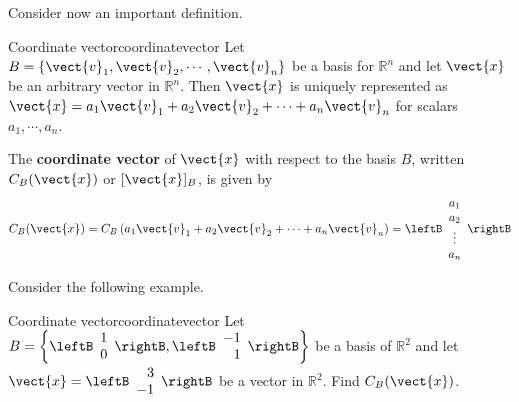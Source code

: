 Consider now an important definition.

\begin{definition}{Coordinate vector}{coordinatevector}
Let $B = \left\{ \vect{v}_1, \vect{v}_2, \cdots, \vect{v}_n \right\}$
be a basis for $\mathbb{R}^n$ and let $\vect{x}$ be an arbitrary
vector in $\mathbb{R}^n$. Then $\vect{x}$ is uniquely represented as
$\vect{x} = a_1\vect{v}_1 +
a_2\vect{v}_2 + \cdots + a_n\vect{v}_n$ for scalars $a_1, \cdots,
a_n$. 

The  \textbf{coordinate vector} of $\vect{x}$ with respect to the
basis $B$, written $C_B(\vect{x})$ or  $[\vect{x}]_B$,  is given by
\[
C_B(\vect{x}) =  C_B \left( a_1\vect{v}_1 + a_2\vect{v}_2 + \cdots + a_n\vect{v}_n \right) = \leftB
\begin{array}{c}
a_1 \\
a_2 \\
\vdots \\
a_n
\end{array} \rightB
\] 
\end{definition}

Consider the following example.

\begin{example}{Coordinate vector}{coordinatevector}
Let $B = \left\{ \leftB \begin{array}{r}
1 \\
0 
\end{array} \rightB, \leftB \begin{array}{r}
-1 \\
1
\end{array} \rightB \right\}$ be a basis of $\mathbb{R}^2$ and let $\vect{x} = \leftB
\begin{array}{r}
3 \\
-1
\end{array}
\rightB$ be a vector in $\mathbb{R}^2$. Find $C_B(\vect{x})$. 
\end{example}

